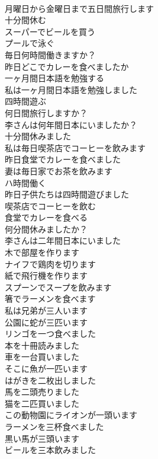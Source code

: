 \documentclass[8pt]{extreport}
\begin{document}
\begin{CJK}{UTF8}{min}
\\	月曜日から金曜日まで五日間旅行します	
\\	十分間休む	
\\	スーパーでビールを買う	
\\	プールで泳ぐ	
\\	毎日何時間働きますか？	
\\	昨日どこでカレーを食べましたか	
\\	一ヶ月間日本語を勉強する	
\\	私は一ヶ月間日本語を勉強しました	
\\	四時間遊ぶ	
\\	何日間旅行しますか？	
\\	李さんは何年間日本にいましたか？	
\\	十分間休みました	
\\	私は毎日喫茶店でコーヒーを飲みます	
\\	昨日食堂でカレーを食べました	
\\	妻は毎日家でお茶を飲みます	
\\	ハ時間働く	
\\	昨日子供たちは四時間遊びました	
\\	喫茶店でコーヒーを飲む	
\\	食堂でカレーを食べる	
\\	何分間休みましたか？	
\\	李さんは二年間日本にいました	
\\	木で部屋を作ります	
\\	ナイフで鶏肉を切ります	
\\	紙で飛行機を作ります	
\\	スプーンでスープを飲みます	
\\	箸でラーメンを食べます	
\\	私は兄弟が三人います	
\\	公園に蛇が三匹います	
\\	リンゴを一つ食べました	
\\	本を十冊読みました	
\\	車を一台買いました	
\\	そこに魚が一匹います	
\\	はがきを二枚出しました	
\\	馬を二頭売りました	
\\	猫を二匹買いました	
\\	この動物園にライオンが一頭います	
\\	ラーメンを三杯食べました	
\\	黒い馬が三頭います	
\\	ビールを三本飲みました	

\end{CJK}
\end{document}

